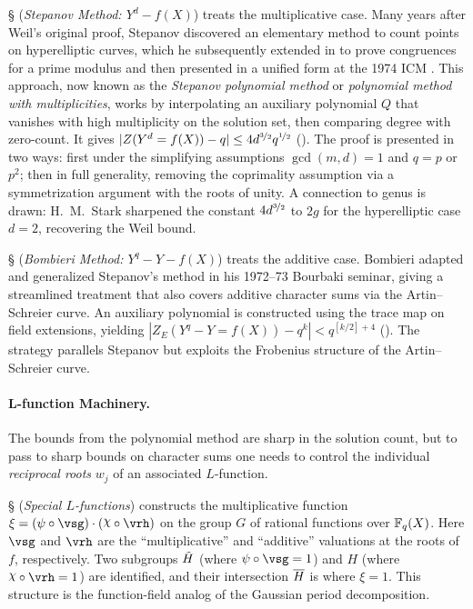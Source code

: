 \S {} (\emph{Stepanov Method: $Y^d-f(X)$}) treats the multiplicative case. Many years after Weil's original proof, Stepanov \cite{Stepanov1969} discovered an elementary method to count points on hyperelliptic curves, which he subsequently extended in \cite{Stepanov1970} to prove congruences for a prime modulus and then presented in a unified form at the 1974 ICM \cite{stepanov1974elementary}. This approach, now known as the \emph{Stepanov polynomial method} or \emph{polynomial method with multiplicities}, works by interpolating an auxiliary polynomial $Q$ that vanishes with high multiplicity on the solution set, then comparing degree with zero-count. It gives $|Z(Y^d=f(X))-q|\leq 4d^{\nicefrac32}q^{\nicefrac12}$ (\Stepanov). The proof is presented in two ways: first under the simplifying assumptions $\gcd(m,d)=1$ and $q=p$ or $p^2$; then in full generality, removing the coprimality assumption via a symmetrization argument with the roots of unity. A connection to genus is drawn: H.\ M.\ Stark sharpened the constant $4d^{\nicefrac32}$ to $2g$ for the hyperelliptic case $d=2$, recovering the Weil bound.

\S {} (\emph{Bombieri Method: $Y^q-Y-f(X)$}) treats the additive case. Bombieri \cite{Bombieri} adapted and generalized Stepanov's method in his 1972--73 Bourbaki seminar, giving a streamlined treatment that also covers additive character sums via the Artin--Schreier curve. An auxiliary polynomial is constructed using the trace map on field extensions, yielding $|Z_E(Y^q-Y=f(X))-q^k|<q^{[k/2]+4}$ (\Bombieri). The strategy parallels Stepanov but exploits the Frobenius structure of the Artin--Schreier curve.

\paragraph*{L-function Machinery.}
The bounds from the polynomial method are sharp in the solution count, but to pass to sharp bounds on character sums one needs to control the individual \emph{reciprocal roots} $w_j$ of an associated $L$-function.

\S {} (\emph{Special $L$-functions}) constructs the multiplicative function $\xi = (\psi\circ\vsg)\cdot(\chi\circ\vrh)$ on the group $G$ of rational functions over $\mathbb{F}_q(X)$. Here $\vsg$ and $\vrh$ are the ``multiplicative'' and ``additive'' valuations at the roots of $f$, respectively. Two subgroups $\tilde{H}$ (where $\psi\circ\vsg=1$) and $H$ (where $\chi\circ\vrh=1$) are identified, and their intersection $\overline{H}$ is where $\xi=1$. This structure is the function-field analog of the Gaussian period decomposition.

